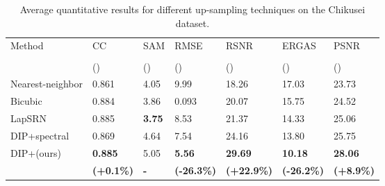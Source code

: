 \documentclass[journal]{IEEEtran}
\begin{document}
    \begin{table}[tb]
        \centering
        \caption{Average quantitative results for different up-sampling techniques on the Chikusei dataset.}
        \begin{tabular}{lp{0.5cm}p{0.6cm}p{0.7cm}p{0.6cm}p{0.7cm}p{0.6cm}}
        \hline
        \multirow{3}{*}{Method} & CC   & SAM & RMSE  & RSNR   & ERGAS       & PSNR \\
        & & &  & & & \\
        & () & () & () & () & () & ()\\
        \hline
        Nearest-neighbor    & 0.861 & 4.05  & 9.99 & 18.26 & 17.03  & 23.73\\
        Bicubic             & 0.884 & 3.86 & 0.093 & 20.07 & 15.75  & 24.52\\
        LapSRN \cite{LapSRN}& 0.885 & \textbf{3.75}& 8.53  & 21.37  & 14.33 & 25.06\\
        DIP+spectral\cite{DHP-DARN}   & 0.869  & 4.64   & 7.54  & 24.16 & 13.80 & 25.75\\
        DIP+(ours)  & \textbf{0.885}   & 5.05 & \textbf{5.56} & \textbf{29.69}    & \textbf{10.18}  & \textbf{28.06}\\
                            & \textbf{\tiny(+0.1\%)} &         \textbf{-}          & \textbf{\tiny(-26.3\%)} &    \textbf{\tiny(+22.9\%)} & \textbf{\tiny(-26.2\%)} & \textbf{\tiny(+8.9\%)} \\
        \hline
        \end{tabular}
        \label{tab:chikusei_lambda_tune_qt}
    \end{table}
\end{document}
